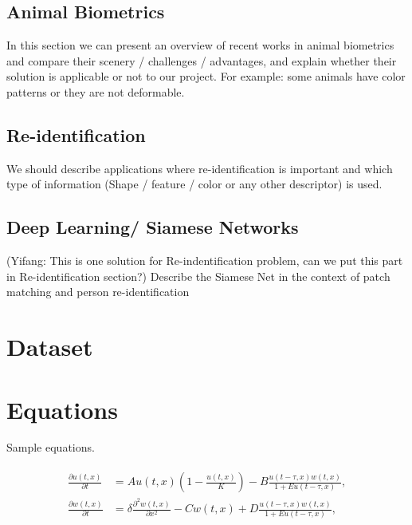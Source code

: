 \documentclass{cta-author}%
\begin{document}
\subsection{Animal Biometrics}


In this section we can present an overview of recent works in animal biometrics and compare their scenery / challenges / advantages, and explain whether their solution is applicable or not to our project.
For example: some animals have color patterns or they are not deformable.

\subsection{Re-identification}

We should describe applications where re-identification is important and which type of information (Shape / feature /  color or any other descriptor) is used.

\subsection{Deep Learning/ Siamese Networks}
 (Yifang: This is one solution for Re-indentification problem, can we put this part in Re-identification section?)   \cite{zagoruyko2015learning}
	Describe the Siamese Net in the context of patch matching and person re-identification
	
	
	

\section{Dataset}	

\cite{liubiometric}

\section{Equations}

Sample equations.

\begin{align}\label{1.1}
\begin{split}
\frac{\partial u(t,x)}{\partial t} &= Au(t,x) \left(1-\frac{u(t,x)}{K}\right)-B\frac{u(t-\tau,x) w(t,x)}{1+Eu(t-\tau,x)},\\
\frac{\partial w(t,x)}{\partial t} &=\delta \frac{\partial^2w(t,x)}{\partial x^2}-Cw(t,x)+D\frac{u(t-\tau,x)w(t,x)}{1+Eu(t-\tau,x)},
\end{split}
\end{align}
\end{document}

